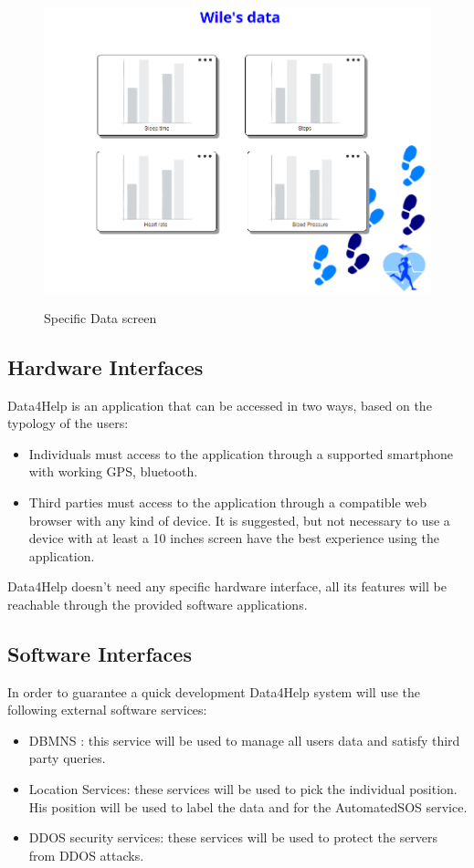 \begin{figure}[H]
\centering
  \includegraphics[width=12cm,height=9cm]{resources/Screen/individualdatavisualization.png}
  \caption{Specific Data screen}
  \label{fig:WebApp Specific data screen}
\end{figure}

\subsection{Hardware Interfaces}
Data4Help is an application that can be accessed in two ways, based on the typology of the users:
\begin{itemize}
\item Individuals must access to the application through a supported smartphone with working GPS, bluetooth.
\item Third parties must access to the application through a compatible web browser with any kind of device. It is suggested, but not necessary to use a device with at least a 10 inches screen have the best experience using the application.
\end{itemize}
Data4Help doesn't need any specific hardware interface, all its features will be reachable through the provided software applications.








\subsection{Software Interfaces}
In order to guarantee a quick development Data4Help system will use the following external software services:
\begin{itemize}
\item DBMNS : this service will be used to manage all users data and satisfy third party queries.
\item Location Services: these services will be used to pick the individual position. His position will be used to label the data and for the AutomatedSOS service.
\item DDOS security services: these services will be used to protect the servers from DDOS attacks.
\end{itemize}

